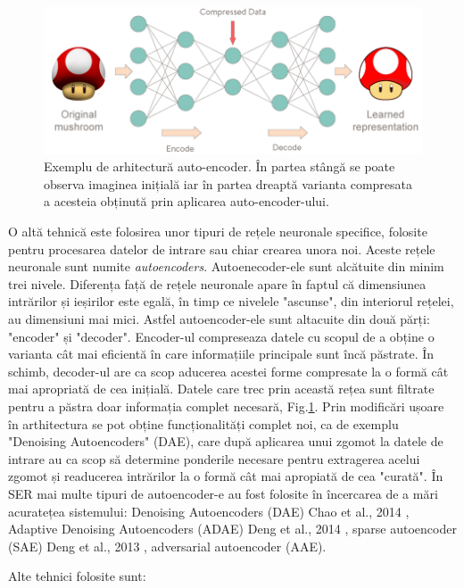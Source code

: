 \documentclass[a4paper,12pt]{book}
\begin{document}
						\begin{figure}[h]
							\centering
							\includegraphics[scale=0.4]{mushroom_encoder}
							\caption{Exemplu de arhitectură auto-encoder. În partea stângă se poate observa imaginea inițială iar în partea dreaptă varianta compresata a acesteia obținută prin aplicarea auto-encoder-ului.}
							\label{fig:ae}							
						\end{figure}		
						O altă tehnică este folosirea unor tipuri de rețele neuronale specifice, folosite pentru procesarea datelor de intrare sau chiar crearea unora noi. Aceste rețele neuronale sunt numite \textit{autoencoders}. Autoenecoder-ele sunt alcătuite din minim trei nivele. Diferența față de rețele neuronale apare în faptul că dimensiunea intrărilor și ieșirilor este egală, în timp ce nivelele "ascunse", din interiorul rețelei, au dimensiuni mai mici. Astfel autoencoder-ele sunt altacuite din două părți: "encoder" și "decoder". Encoder-ul compreseaza datele cu scopul de a obține o varianta cât mai eficientă în care informațiile principale sunt încă păstrate. În schimb, decoder-ul are ca scop aducerea acestei forme compresate la o formă cât mai apropriată de cea inițială. Datele care trec prin această rețea sunt filtrate pentru a păstra doar informația complet necesară, Fig.\ref{fig:ae}. Prin modificări ușoare în arthitectura se pot obține funcționalități complet noi, ca de exemplu "Denoising Autoencoders" (DAE), care după aplicarea unui zgomot la datele de intrare au ca scop să determine ponderile necesare pentru extragerea acelui zgomot și readucerea intrărilor la o formă cât mai apropiată de cea "curată". În SER mai multe tipuri de autoencoder-e au fost folosite în încercarea de a mări acuratețea sistemului: Denoising Autoencoders (DAE) Chao et al., 2014 \cite{dae}, Adaptive Denoising Autoencoders (ADAE) Deng et al., 2014 \cite{adae}, sparse autoencoder (SAE) Deng et al., 2013 \cite{sdae}, adversarial autoencoder (AAE). \par
						Alte tehnici folosite sunt: 
\end{document}

